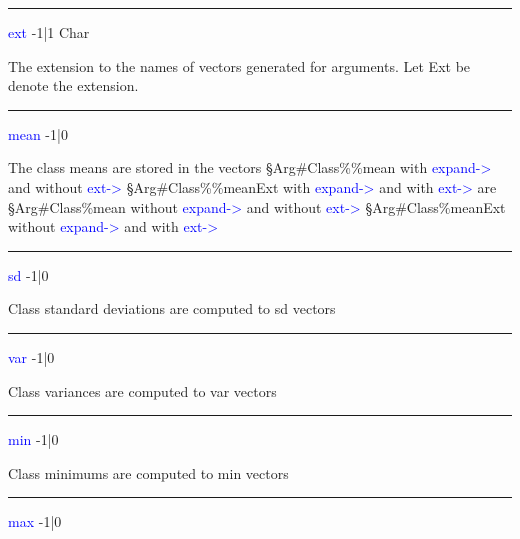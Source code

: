 \hrule
\vspace{0.3cm}
\noindent \textcolor{blue}{ext} \tabto{3cm} -1|1 \tabto{5cm}  Char \tabto{7cm}
\begin{changemargin}{3cm}{0cm}
\noindent The extension to the names of vectors generated for arguments. Let
Ext be denote the extension.
\end{changemargin}
\vspace{0.3cm}
\hrule
\vspace{0.3cm}
\noindent \textcolor{blue}{mean} \tabto{3cm} -1|0 \tabto{5cm}    \tabto{7cm}
\begin{changemargin}{3cm}{0cm}
\noindent The class means are stored in the vectors \newline
§Arg\#Class\%\%mean with \textcolor{blue}{expand->} and without \textcolor{blue}{ext->}\newline
§Arg\#Class\%\%meanExt with \textcolor{blue}{expand->} and with \textcolor{blue}{ext->} are \newline
§Arg\#Class\%mean without \textcolor{blue}{expand->} and without \textcolor{blue}{ext->} \newline
§Arg\#Class\%meanExt without \textcolor{blue}{expand->} and with \textcolor{blue}{ext->}
\end{changemargin}
\vspace{0.3cm}
\hrule
\vspace{0.3cm}
\noindent \textcolor{blue}{sd} \tabto{3cm} -1|0 \tabto{5cm}    \tabto{7cm}
\begin{changemargin}{3cm}{0cm}
\noindent  Class standard deviations are computed to sd vectors
\end{changemargin}
\vspace{0.3cm}
\hrule
\vspace{0.3cm}
\noindent \textcolor{blue}{var} \tabto{3cm} -1|0 \tabto{5cm}    \tabto{7cm}
\begin{changemargin}{3cm}{0cm}
\noindent  Class variances are computed to var vectors
\end{changemargin}
\vspace{0.3cm}
\hrule
\vspace{0.3cm}
\noindent \textcolor{blue}{min} \tabto{3cm} -1|0 \tabto{5cm}    \tabto{7cm}
\begin{changemargin}{3cm}{0cm}
\noindent  Class minimums are computed to min vectors
\end{changemargin}
\vspace{0.3cm}
\hrule
\vspace{0.3cm}
\noindent \textcolor{blue}{max} \tabto{3cm} -1|0 \tabto{5cm}    \tabto{7cm}
